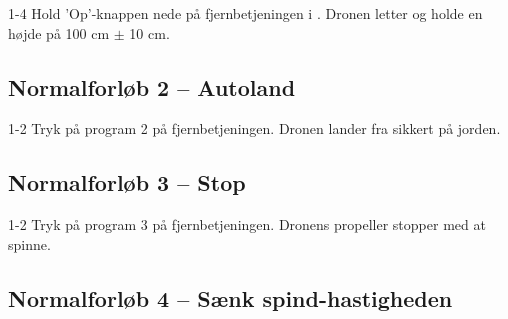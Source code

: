 \documentclass[Main]{subfiles}
\begin{document}
\begin{TestCase}
\TC
{1-4}
{Hold 'Op'-knappen nede på fjernbetjeningen i .}
{Dronen letter og holde en højde på 100 cm $\pm$ 10 cm.}
{}
\end{TestCase}





\subsection*{Normalforløb 2 -- Autoland}

\begin{TestCaseIntro}
\end{TestCaseIntro}

\begin{TestCase}
\TC
{1-2}
{Tryk på program 2 på fjernbetjeningen.}
{Dronen lander fra sikkert på jorden.}
{}
\end{TestCase}




\subsection*{Normalforløb 3 -- Stop}

\begin{TestCaseIntro}
\end{TestCaseIntro}

\begin{TestCase}
\TC
{1-2}
{Tryk på program 3 på fjernbetjeningen.}
{Dronens propeller stopper med at spinne.}
{}
\end{TestCase}




\newpage
\subsection*{Normalforløb 4 -- Sænk spind-hastigheden}

\begin{TestCaseIntro}
\end{TestCaseIntro}
\end{document}
